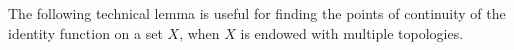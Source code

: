 \documentclass[11pt]{amsart}
\makeatletter
\newtheorem{lemma}[theorem]{Lemma}
\theoremstyle{definition}
\newcommand{\N}{\mathbb N}
\newcommand{\Tau}{\mathcal T}
\newcommand{\makeset}[2]{\left\lbrace #1 \; \colon\;
 \begin{tabular}{@{}l@{}}
   #2
  \end{tabular}
  \right\rbrace}
\makeatother
\begin{document}



The following technical lemma is useful for finding the points of continuity of the identity function on a set $X$, when $X$ is endowed with multiple topologies.
\end{document}

